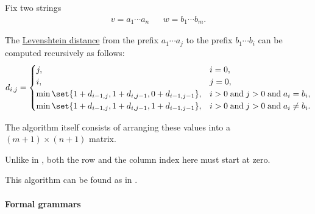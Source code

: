 \begin{algorithm}\label{alg:wagner_fisher}
  Fix two strings
  \begin{align*}
    v = a_1 \cdots a_n && w = b_1 \cdots b_m.
  \end{align*}

  The \hyperref[def:levenshtein_distance]{Levenshtein distance} from the prefix \( a_1 \cdots a_j \) to the prefix \( b_1 \cdots b_i \) can be computed recursively as follows:
  \begin{equation*}
    d_{i,j} = \begin{cases}
      j,                                                         &i = 0, \\
      i,                                                         &j = 0, \\
      \min\set{ 1 + d_{i-1,j}, 1 + d_{i,j-1}, 0 + d_{i-1,j-1} }, &i > 0 \T{and} j > 0 \T{and} a_i = b_i, \\
      \min\set{ 1 + d_{i-1,j}, 1 + d_{i,j-1}, 1 + d_{i-1,j-1} }, &i > 0 \T{and} j > 0 \T{and} a_i \neq b_i.
    \end{cases}
  \end{equation*}

  The algorithm itself consists of arranging these values into a \( (m + 1) \times (n + 1) \) matrix.
\end{algorithm}
\begin{comments}
  \item Unlike in , both the row and the column index here must start at zero.
  \item This algorithm can be found as  in \cite{notebook:code}.
\end{comments}

\paragraph{Formal grammars}

